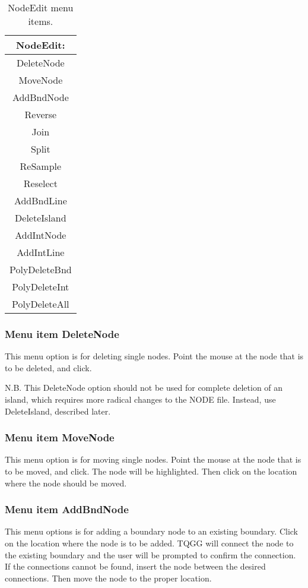 \documentclass{article}
\begin{document}
\begin{table}[htb!]
 \caption{NodeEdit menu items.}
  \begin{center}
   \begin{tabular}{|c|}
    \hline
NodeEdit:\\     \hline
DeleteNode \\ MoveNode \\     \hline
AddBndNode \\ Reverse \\ Join \\ Split \\ ReSample \\ Reselect \\ AddBndLine \\ DeleteIsland \\     \hline
AddIntNode \\ AddIntLine \\     \hline
PolyDeleteBnd \\ PolyDeleteInt \\ PolyDeleteAll \\
    \hline
   \end{tabular}
   \label{tab:NODEEDIT}
  \end{center}
\end{table}

\subsubsection[Menu item DeleteNode]{Menu item DeleteNode}
This menu option is for deleting single nodes. Point the mouse at the node that is to be deleted, and click.

N.B. This DeleteNode option should not be used for complete deletion of an island, which requires more radical changes to the NODE file. Instead, use DeleteIsland, described later.

\subsubsection[Menu item MoveNode]{Menu item MoveNode}
This menu option is for moving single nodes. Point the mouse at the node that is to be moved, and click. The node will be highlighted. Then click on the location where the node should be moved.

\subsubsection[Menu item AddBndNode]{Menu item AddBndNode}
This menu options is for adding a boundary node to an existing boundary. Click on the location where the node is to be added. TQGG will connect the node to the existing boundary and the user will be prompted to confirm the connection. If the connections cannot be found, insert the node between the desired connections. Then move the node to the proper location.
\end{document}
